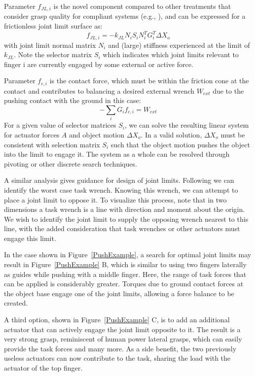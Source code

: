 \smallskip
\noindent
Parameter $f_{JL, i}$ is the novel component compared to other treatments that consider grasp quality for compliant systems (e.g., \cite{lin2000stiffness}), and can be expressed for a frictionless joint limit surface as:
\begin{equation}
	f_{JL, i} = -k_{JL} N_i S_i N^T_i      G^T_i \Delta X_o
\end{equation}
with joint limit normal matrix $N_i$ and (large) stiffness experienced at the limit of $k_{JL}$.    Note the selector matrix $S_i$ which indicates which joint limits relevant to finger i are currently engaged by some external or active force.

\smallskip
\noindent
Parameter $f_{c, i}$ is the contact force, which must be within the friction cone at the contact and contributes to balancing a desired external wrench $W_{ext}$ due to the pushing contact with the ground in this case:
\begin{equation}
  - \sum_i G_i f_{c, i} = W_{ext}
\end{equation}
For a given value of selector matrices $S_i$, we can solve the resulting linear system for actuator forces $A$ and object motion $\Delta X_o$.    In a valid solution, $\Delta X_o$ must be consistent with selection matrix $S_i$ such that the object motion pushes the object into the limit to engage it.   The system as a whole can be resolved through pivoting or other discrete search techniques.

A similar analysis gives guidance for design of joint limits.  Following \cite{Li:graspDB07} we can identify the worst case task wrench.   Knowing this wrench, we can attempt to place a joint limit to oppose it.   To visualize this process, note that in two dimensions a task wrench is a line with direction and moment about the origin.  We wish to identify the joint limit to supply the opposing wrench nearest to this line, with the added consideration that task wrenches or other actuators must engage this limit.
 
In the case shown in Figure~\ref{PushExample}, a search for optimal joint limits may result in Figure~\ref{PushExample} B, which is similar to using two fingers laterally as guides while pushing with a middle finger.   Here, the range of task forces that can be applied is considerably greater.     Torques due to ground contact forces at the object base engage one of the joint limits, allowing a force balance to be created.

A third option, shown in Figure~\ref{PushExample} C, is to add an additional actuator that can actively engage the joint limit opposite to it.   The result is a very strong grasp, reminiscent of human power lateral grasps, which can easily provide the task forces and many more.   As a side benefit, the two previously useless actuators can now contribute to the task, sharing the load with the actuator of the top finger.

